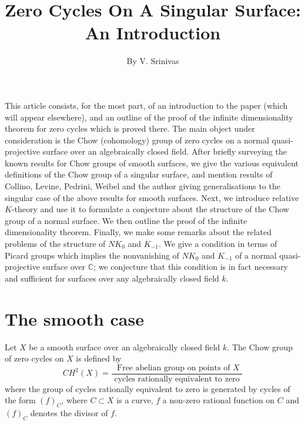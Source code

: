 \title{Zero Cycles On A Singular Surface: An Introduction}

\author{By V. Srinivas}

\date{}
\maketitle


\setcounter{page}{401}
\setcounter{pageoriginal}{528}

\setcounter{section}{-1}
\section{}\pageoriginale
This article consists, for the most part, of an introduction
to the paper \cite{Srinivasb} (which will appear elsewhere), and an
outline of the proof of the infinite dimensionality theorem for zero
cycles which is proved there. The main object under consideration is
the Chow (cohomology) group of zero cycles on a normal
quasi-projective surface over an algebraically closed field. After
briefly surveying the known results for Chow groups of smooth
surfaces, we give the various equivalent definitions of the Chow group
of a singular surface, and mention results of Collino, Levine,
Pedrini, Weibel and the author giving generalisations to the singular
case of the above results for smooth surfaces. Next, we introduce
relative $K$-theory and use it to formulate a conjecture about the
structure of the Chow group of a normal surface. We then outline the
proof of the infinite dimensionality theorem. Finally, we make some
remarks about the related problems of the structure of $NK_0$ and
$K_{-1}$. We give a condition in terms of Picard groups which implies
the nonvanishing of $NK_0$ and $K_{-1}$ of a normal quasi-projective
surface over $\mathbb{C}$; we conjecture that this condition is in
fact necessary and sufficient for surfaces over any algebraically
closed field $k$.  

\section{The smooth case}\label{s1}\pageoriginale

Let $X$ be a smooth surface over an algebraically closed field $k$. The Chow group of zero cycles on $X$ is defined by $$
CH^{2}(X)=\dfrac{\text{ Free abelian group on points of } X}{\text{ cycles rationally equivalent to zero }}
$$
where the group of cycles rationally equivalent to zero is generated by cycles of the form $(f)_C$, where $C\subset X$ is a curve, $f$ a non-zero rational function on $C$ and $(f)_C$ denotes the divisor of $f$. 


